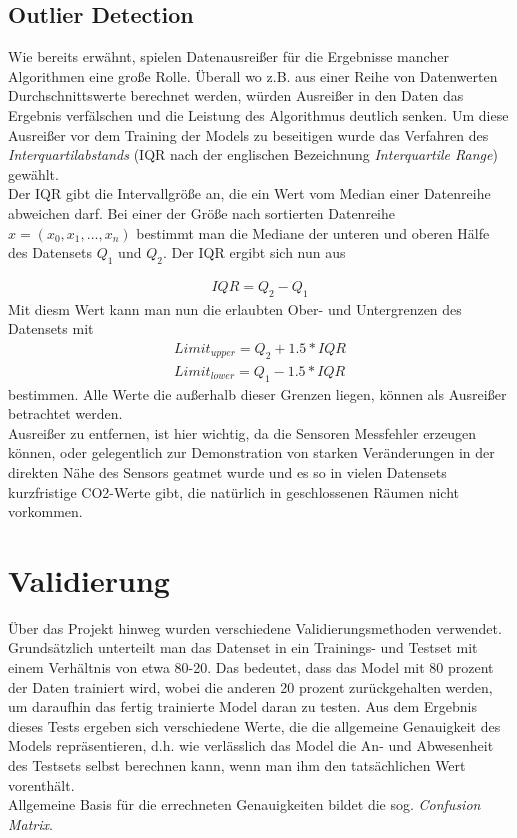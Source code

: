 \subsection{Outlier Detection}
Wie bereits erwähnt, spielen Datenausreißer für die Ergebnisse mancher Algorithmen eine große Rolle. Überall 
wo z.B. aus einer Reihe von Datenwerten Durchschnittswerte berechnet werden, würden Ausreißer in den Daten das 
Ergebnis verfälschen und die Leistung des Algorithmus deutlich senken.
Um diese Ausreißer vor dem Training der Models zu beseitigen wurde das Verfahren des 
\textit{Interquartilabstands} (IQR nach der englischen Bezeichnung \textit{Interquartile Range}) gewählt.\\
Der IQR gibt die Intervallgröße an, die ein Wert vom Median einer Datenreihe abweichen darf. Bei einer 
der Größe nach sortierten Datenreihe $x = (x_0,x_1,...,x_n)$ bestimmt man die Mediane der unteren und oberen 
Hälfe des Datensets $Q_1$ und $Q_2$. Der IQR ergibt sich nun aus 

\begin{align}
    IQR = Q_2 - Q_1
\end{align}
Mit diesm Wert kann man nun die erlaubten Ober- und Untergrenzen 
des Datensets mit 
\begin{align}
    Limit_{upper} = Q_2 + 1.5 * IQR \\
    Limit_{lower} = Q_1 - 1.5 * IQR
\end{align} 
bestimmen. Alle Werte die außerhalb dieser Grenzen liegen, können als Ausreißer betrachtet werden.\\
Ausreißer zu entfernen, ist hier wichtig, da die Sensoren Messfehler erzeugen können, oder gelegentlich zur 
Demonstration von starken Veränderungen in der direkten Nähe des Sensors geatmet wurde und es so in vielen 
Datensets kurzfristige CO2-Werte gibt, die natürlich in geschlossenen Räumen nicht vorkommen.

\section{Validierung}
\sloppy
Über das Projekt hinweg wurden verschiedene Validierungsmethoden verwendet. Grundsätzlich unterteilt man das 
Datenset in ein Trainings- und Testset mit einem Verhältnis von etwa 80-20. Das bedeutet, dass das Model mit
80 prozent der Daten trainiert wird, wobei die anderen 20 prozent zurückgehalten werden, um daraufhin das 
fertig trainierte Model daran zu testen. Aus dem Ergebnis dieses Tests ergeben sich verschiedene Werte, die  
die allgemeine Genauigkeit des Models repräsentieren, d.h. wie verlässlich das Model die An- und Abwesenheit 
des Testsets selbst berechnen kann, wenn man ihm den tatsächlichen Wert vorenthält.\\
Allgemeine Basis für die errechneten Genauigkeiten bildet die sog. \textit{Confusion Matrix}.

